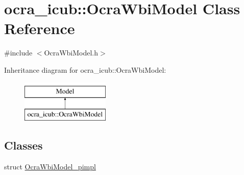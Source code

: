 \hypertarget{classocra__icub_1_1OcraWbiModel}{}\section{ocra\+\_\+icub\+:\+:Ocra\+Wbi\+Model Class Reference}
\label{classocra__icub_1_1OcraWbiModel}


{\ttfamily \#include $<$Ocra\+Wbi\+Model.\+h$>$}

Inheritance diagram for ocra\+\_\+icub\+:\+:Ocra\+Wbi\+Model\+:\begin{figure}[H]
\begin{center}
\leavevmode
\includegraphics[height=2.000000cm]{classocra__icub_1_1OcraWbiModel}
\end{center}
\end{figure}
\subsection*{Classes}
\begin{DoxyCompactItemize}
\item 
struct \hyperlink{structOcraWbiModel_1_1OcraWbiModel__pimpl}{Ocra\+Wbi\+Model\+\_\+pimpl}
\end{DoxyCompactItemize}
